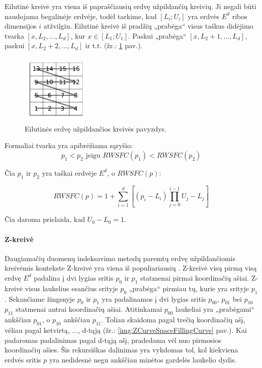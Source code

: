 Eilutinė kreivė yra viena iš papraščiausių erdvę užpildančių kreivių.
Ji negali būti naudojama begalinėje erdvėje, todėl tarkime, kad $[L_i; U_i]$ yra erdvės $E^d$ ribos dimensijos $i$ atžvilgiu.
Eilutinė kreivė iš pradžių „prabėga“ visus taškus didėjimo tvarka $[x, L_2, ..., L_d]$, kur $x \in [L_1; U_1]$.
Paskui „prabėga“ $[x, L_2 + 1, ..., L_d]$, paskui $[x, L_2 + 2, ..., L_d]$ ir t.t. (žr.: \ref{img:RowWiseSpaceFillingCurve} pav.).

\begin{figure}[H]
\begin{center}
\includegraphics[width=0.3\textwidth]{img/RowWiseSpaceFillingCurve.png}
\caption{Eilutinės erdvę užpildančios kreivės pavyzdys.}
\label{img:RowWiseSpaceFillingCurve}
\end{center}
\end{figure}


Formaliai tvarka yra apibrėžiama sąryšio:
\begin{equation}
	p_1 < p_2 \text{ jeigu } RWSFC(p_1) < RWSFC(p_2)
\label{eq:RowWiseSFCComparison}
\end{equation}

Čia $p_1$ ir $p_2$ yra taškai erdvėje $E^d$, o $RWSFC(p)$:

\begin{equation}
	RWSFC(p) = 1 + \sum_{i=1}^{d} [(p_i - L_i) \prod_{j=0}^{i - 1}U_j - L_j]
\label{eq:RowWiseSFCValue}
\end{equation}

Čia daroma prielaida, kad $U_0 - L_0 = 1$.



\paragraph{Z-kreivė}

Daugiamačių duomenų indeksavimo metodų paremtų erdvę užpildančiomis kreivėmis kontekste Z-kreivė yra viena iš populiariausių \cite{ramsak2000integrating}.
Z-kreivė visų pirmą visą erdvę $E^d$ padalina į dvi lygias sritis $p_0$ ir $p_1$ statmenai pirmai koordinačių ašiai.
Z-kreivė visus laukelius esančius srityje $p_0$ „prabėga“ pirmiau tų, kurie yra srityje $p_1$.
Sekančiame žingsnyje $p_0$ ir $p_1$ yra padalinamos į dvi lygias sritis $p_{00}$, $p_{01}$ bei $p_{10}$ $p_{11}$ statmenai antrai koordinačių ašiai.
Atitinkamai $p_{00}$ laukeliai yra „prabėgami“ ankščiau $p_{01}$, o $p_{10}$ ankščiau $p_{11}$.
Toliau skaidoma pagal trečią koordinačių ašį, vėliau pagal ketvirtą, ..., d-tąją (žr.: \ref{img:ZCurveSpaceFillingCurve} pav.).
Kai padaromas padalinimas pagal d-tąją ašį, pradedama vėl nuo pirmosios koordinačių ašies.
Šis rekursiškas dalinimas yra vykdomas tol, kol kiekviena erdvės sritis $p$ yra nedidesnė negu ankščiau minėtos gardelės laukelio dydis.

